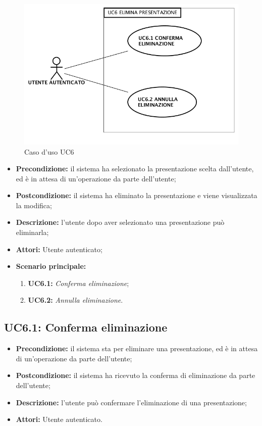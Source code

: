 \begin{figure}[h]
	\begin{center}
	\includegraphics[scale=0.4]{diagram/UC6.png}
	\caption{Caso d'uso UC6}
	\end{center}
\end{figure}
\begin{itemize}
	\item \textbf{Precondizione:} il sistema ha selezionato la presentazione scelta dall'utente, ed è in attesa di un'operazione da parte dell'utente;
	\item \textbf{Postcondizione:} il sistema ha eliminato la presentazione e viene visualizzata la modifica;
	\item \textbf{Descrizione:} l'utente dopo aver selezionato una presentazione può eliminarla;
	\item \textbf{Attori:} Utente autenticato;
	\item \textbf{Scenario principale:}
	\begin{enumerate}
		\item \textbf{ UC6.1:} \textit{ Conferma eliminazione};
		\item \textbf{ UC6.2:} \textit{ Annulla eliminazione}.
	\end{enumerate}
\end{itemize}
\subsection{ UC6.1: Conferma eliminazione}

\begin{itemize}
	\item \textbf{Precondizione:} il sistema sta per eliminare una presentazione, ed è in attesa di un'operazione da parte dell'utente;
	\item \textbf{Postcondizione:} il sistema ha ricevuto la conferma di eliminazione da parte dell'utente;
	\item \textbf{Descrizione:} l'utente può confermare l'eliminazione di una presentazione;
	\item \textbf{Attori:} Utente autenticato.
\end{itemize}
